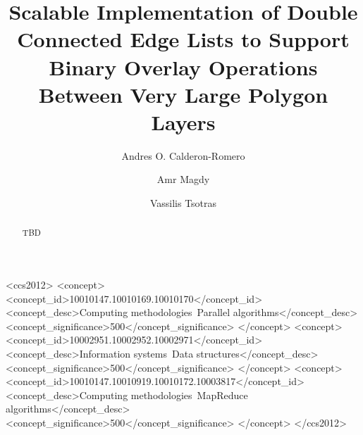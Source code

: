 \documentclass[sigconf]{acmart}
\begin{document}
\title{Scalable Implementation of Double Connected Edge Lists to Support Binary Overlay Operations Between Very Large Polygon Layers}

\author{Andres O. Calderon-Romero}
\author{Amr Magdy}
\author{Vassilis Tsotras}


\renewcommand{\shortauthors}{Trovato and Tobin, et al.}

\begin{abstract}
    TBD
\end{abstract}

\begin{CCSXML}
<ccs2012>
   <concept>
       <concept_id>10010147.10010169.10010170</concept_id>
       <concept_desc>Computing methodologies~Parallel algorithms</concept_desc>
       <concept_significance>500</concept_significance>
       </concept>
   <concept>
       <concept_id>10002951.10002952.10002971</concept_id>
       <concept_desc>Information systems~Data structures</concept_desc>
       <concept_significance>500</concept_significance>
       </concept>
   <concept>
       <concept_id>10010147.10010919.10010172.10003817</concept_id>
       <concept_desc>Computing methodologies~MapReduce algorithms</concept_desc>
       <concept_significance>500</concept_significance>
       </concept>
 </ccs2012>
\end{CCSXML}
\end{document}
